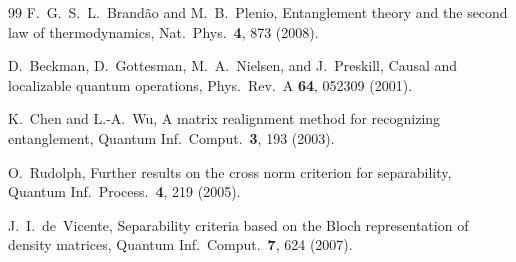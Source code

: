 \documentclass[11pt,a4paper]{article}
\theoremstyle{definition}
\theoremstyle{remark}
\begin{document}
\begin{thebibliography}{99}
 F.~G.~S.~L.~Brand\~ao and M.~B.~Plenio,
Entanglement theory and the second law of thermodynamics,
Nat.\ Phys.\ \textbf{4}, 873 (2008).

 D.~Beckman, D.~Gottesman, M.~A.~Nielsen, and J.~Preskill,
Causal and localizable quantum operations, Phys.\ Rev.\ A \textbf{64}, 052309 (2001).

 K.~Chen and L.-A.~Wu,
A matrix realignment method for recognizing entanglement,
Quantum Inf.\ Comput.\ \textbf{3}, 193 (2003).

 O.~Rudolph,
Further results on the cross norm criterion for separability,
Quantum Inf.\ Process.\ \textbf{4}, 219 (2005).

 J.~I.~de~Vicente,
Separability criteria based on the Bloch representation of density matrices,
Quantum Inf.\ Comput.\ \textbf{7}, 624 (2007).

\end{thebibliography}
\end{document}
